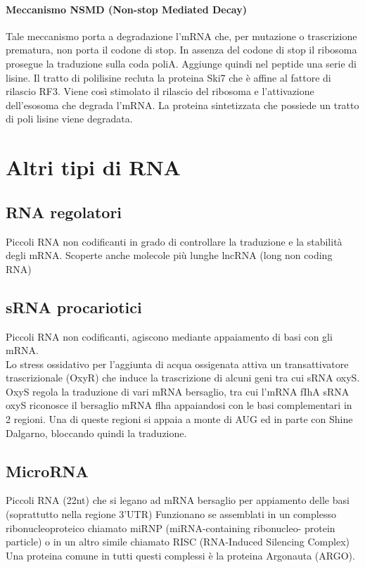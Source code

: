 \documentclass{article}
\begin{document}
\paragraph{Meccanismo NSMD (Non-stop Mediated Decay)} Tale meccanismo porta a degradazione l'mRNA che, per
mutazione o trascrizione prematura, non porta il codone di stop. In assenza del codone di stop il ribosoma
prosegue la traduzione sulla coda poliA. Aggiunge quindi nel peptide una serie di lisine. Il tratto di polilisine recluta la proteina Ski7 che è affine al fattore di
rilascio RF3. Viene così stimolato il rilascio del ribosoma e l'attivazione dell'esosoma che degrada l'mRNA. La proteina sintetizzata che possiede un tratto di poli lisine viene degradata.
\section{Altri tipi di RNA}
\subsection{RNA regolatori}
Piccoli RNA non codificanti in grado di controllare la traduzione e la stabilità degli mRNA.
Scoperte anche molecole più lunghe lncRNA (long non coding RNA)
\subsection{sRNA procariotici}
Piccoli RNA non codificanti, agiscono mediante appaiamento di basi con gli mRNA.\\
Lo stress ossidativo per l'aggiunta di acqua ossigenata attiva un transattivatore trascrizionale (OxyR) che induce la trascrizione di alcuni geni tra cui
sRNA oxyS. OxyS regola la traduzione di vari mRNA bersaglio, tra cui l'mRNA fIhA sRNA oxyS riconosce il bersaglio mRNA flha
appaiandosi con le basi complementari in 2 regioni. Una di queste regioni si appaia a monte di AUG ed in parte con Shine Dalgarno, bloccando quindi la traduzione.
\subsection{MicroRNA}
Piccoli RNA (22nt) che si legano ad mRNA bersaglio per appiamento delle basi (soprattutto nella regione 3'UTR)
Funzionano se assemblati in un complesso ribonucleoproteico chiamato miRNP (miRNA-containing ribonucleo-
protein particle) o in un altro simile chiamato RISC (RNA-Induced Silencing Complex)
Una proteina comune in tutti questi complessi è la proteina Argonauta (ARGO).
\end{document}
